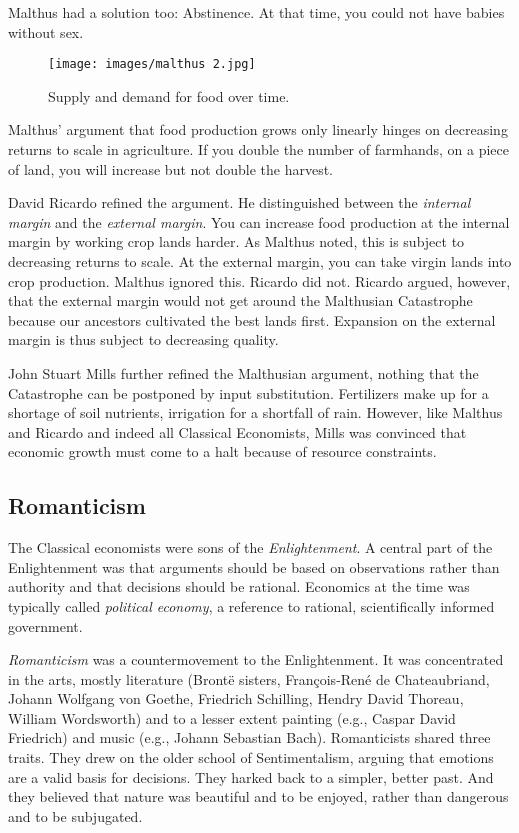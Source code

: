 Malthus had a solution too: Abstinence. At that time, you could not have babies without sex.

\begin{figure}
    \centering
    \texttt{[image: images/malthus 2.jpg]}
    \caption{Supply and demand for food over time.}
    \label{fig:malthus}
\end{figure}

Malthus' argument that food production grows only linearly hinges on decreasing returns to scale in agriculture. If you double the number of farmhands, on a piece of land, you will increase but not double the harvest.

David Ricardo refined the argument. He distinguished between the \emph{internal margin} and the \emph{external margin}. You can increase food production at the internal margin by working crop lands harder. As Malthus noted, this is subject to decreasing returns to scale. At the external margin, you can take virgin lands into crop production. Malthus ignored this. Ricardo did not. Ricardo argued, however, that the external margin would not get around the Malthusian Catastrophe because our ancestors cultivated the best lands first. Expansion on the external margin is thus subject to decreasing quality.

John Stuart Mills further refined the Malthusian argument, nothing that the Catastrophe can be postponed by input substitution. Fertilizers make up for a shortage of soil nutrients, irrigation for a shortfall of rain. However, like Malthus and Ricardo and indeed all Classical Economists, Mills was convinced that economic growth must come to a halt because of resource constraints. 

\subsection{Romanticism}
The Classical economists were sons of the \emph{Enlightenment}. A central part of the Enlightenment was that arguments should be based on observations rather than authority and that decisions should be rational. Economics at the time was typically called \emph{political economy}, a reference to rational, scientifically informed government.

\emph{Romanticism} was a countermovement to the Enlightenment. It was concentrated in the arts, mostly literature (Brontë sisters, François-René de Chateaubriand, Johann Wolfgang von Goethe, Friedrich Schilling, Hendry David Thoreau, William Wordsworth) and to a lesser extent painting (e.g., Caspar David Friedrich) and music (e.g., Johann Sebastian Bach). Romanticists shared three traits. They drew on the older school of Sentimentalism, arguing that emotions are a valid basis for decisions. They harked back to a simpler, better past. And they believed that nature was beautiful and to be enjoyed, rather than dangerous and to be subjugated.

